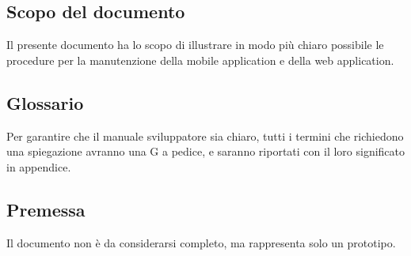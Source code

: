 \documentclass[../manuale-manutentore.tex]{subfiles}
\begin{document}
\subsection{Scopo del documento}%
\label{sub:scopo_del_documento}
Il presente documento ha lo scopo di illustrare in modo più chiaro possibile le procedure per la manutenzione della mobile application e della web application.

\subsection{Glossario}%
\label{sub:glossario}
Per garantire che il manuale sviluppatore sia chiaro, tutti i termini che richiedono una spiegazione avranno una G a pedice, e saranno riportati con il loro significato in appendice.

\subsection{Premessa}%
\label{sub:premessa}
Il documento non è da considerarsi completo, ma rappresenta solo un prototipo.
\end{document}
